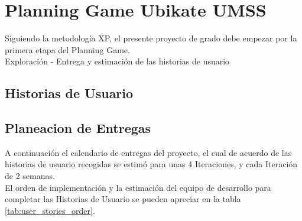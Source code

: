   \chapter{Planning Game Ubikate UMSS}
  \label{chap:caso_estudio}

  Siguiendo la metodología XP, el presente proyecto de grado debe empezar por la primera etapa del Planning Game.\\


  Exploración - Entrega y estimación de las historias de usuario

    \section{Historias de Usuario}
    \label{sec:historias_de_usuario}

      


    \section{Planeacion de Entregas}
    \label{sub:Planeacion de Entregas}

        A continuación el calendario de entregas del proyecto, el cual de acuerdo de las historias de usuario recogidas se estimó para unas 4 Iteraciones, y cada Iteración de 2 semanas.\\

        

        El orden de implementación y la estimación del equipo de desarrollo para completar las Historias de Usuario se pueden apreciar en la tabla \ref{tab:user_stories_order}.

